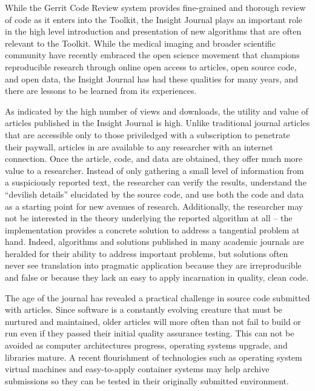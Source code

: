 \documentclass{frontiersENG} %
\begin{document}
While the Gerrit Code Review system provides fine-grained and thorough review
of code as it enters into the Toolkit, the Insight Journal plays an important
role in the high level introduction and presentation of new algorithms that
are often relevant to the Toolkit. While the medical imaging and broader
scientific community have recently embraced the open science movement that
champions reproducible research through online open access to articles, open
source code, and open data, the Insight Journal has had these qualities for
many years, and there are lessons to be learned from its experiences.

As indicated by the high number of views and downloads, the utility and value of
articles published in the Insight Journal is high.  Unlike traditional
journal articles that are accessible only to those priviledged with a
subscription to penetrate their paywall, articles in are available to any
researcher with an internet connection. Once the article, code, and data are
obtained, they offer much more value to a researcher. Instead of only gathering a
small level of information from a suspiciously reported text, the researcher
can verify the results, understand the ``devilish details'' elucidated by the
source code, and use both the code and data as a starting point for new
avenues of research. Additionally, the researcher may not be interested in the
theory underlying the reported algorithm at all -- the implementation provides
a concrete solution to address a tangential problem at hand. Indeed,
algorithms and solutions published in many academic journals are heralded for
their ability to address important problems, but solutions often never see
translation into pragmatic application because they are irreproducible and
false or because they lack an easy to apply incarnation in quality, clean
code.

The age of the journal has revealed a practical challenge in source code
submitted with articles. Since software is a constantly evolving creature that
must be nurtured and maintained, older articles will more often than not fail
to build or run even if they passed their initial quality assurance testing.
This can not be avoided as computer architectures progress, operating systems
upgrade, and libraries mature. A recent flourishment of technologies such as
operating system virtual machines and easy-to-apply container systems may help
archive submissions so they can be tested in their originally submitted
environment.
\end{document}

